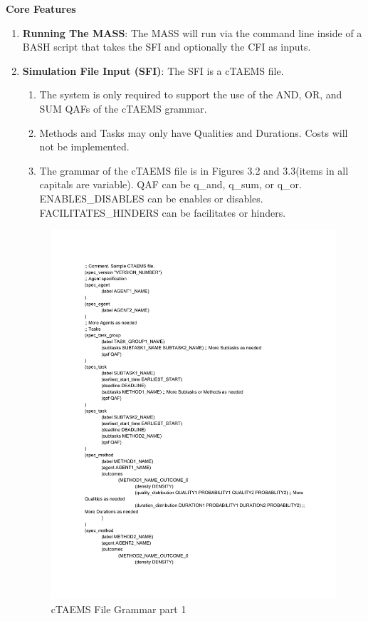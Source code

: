 \begin{center} \textbf{Core Features} \end{center}

\begin{enumerate}

  \item\textbf{Running The MASS}: The MASS will run via the command line inside of a BASH script that takes the SFI and optionally the CFI as inputs.
  
  \item\textbf{Simulation File Input (SFI)}: The SFI is a cTAEMS file.
    \begin{enumerate}
    \item The system is only required to support the use of the AND, OR, and SUM QAFs of the cTAEMS grammar.
    \item Methods and Tasks may only have Qualities and Durations. Costs will not be implemented.
    \item The grammar of the cTAEMS file is in Figures 3.2 and 3.3(items in all capitals are variable).
    	\subitem QAF can be q\_and, q\_sum, or q\_or.
    	\subitem ENABLES\_DISABLES can be enables or disables.
    	\subitem FACILITATES\_HINDERS can be facilitates or hinders.
  \end{enumerate}
  
\begin{figure}[H]
\centering
\includegraphics[trim=1.5cm 2cm 0cm 0cm, page=1, width=4.8in]{figs/cTAEMS.pdf}
\caption{cTAEMS File Grammar part 1}
\label{fig:cTAEMS}
\end{figure}


\end{enumerate}
